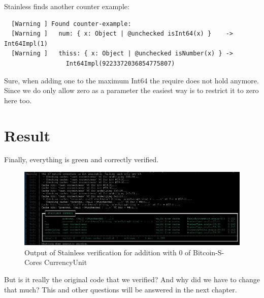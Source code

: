 Stainless finds another counter example:
{\footnotesize\begin{verbatim}
  [Warning ] Found counter-example:
  [Warning ]   num: { x: Object | @unchecked isInt64(x) }    -> Int64Impl(1)
  [Warning ]   thiss: { x: Object | @unchecked isNumber(x) } ->
                 Int64Impl(9223372036854775807)
\end{verbatim}}

Sure, when adding one to the maximum Int64 the require does not hold anymore.
Since we do only allow zero as a parameter the easiest way is to restrict it to zero here too.


\section{Result}

Finally, everything is green and correctly verified.
\begin{figure}[H]
	\centering
		\includegraphics[scale=0.45]{images/final_verify_output.png}
	\caption{Output of Stainless verification for addition with 0 of Bitcoin-S-Cores CurrencyUnit}
	\label{fig:output1}
\end{figure}

But is it really the original code that we verified?
And why did we have to change that much?
This and other questions will be answered in the next chapter.
